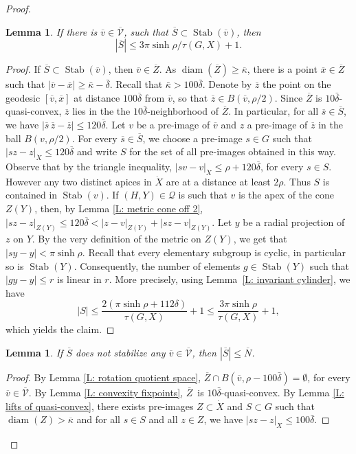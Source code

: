 \documentclass[11pt]{article}
\let\mathcal\mathscr
\theoremstyle{plain}
\newtheorem{lem}[thm]{Lemma}
\theoremstyle{definition}
\DeclareMathOperator{\diam}{diam}
\newcommand{\cX}{\dot{X}}
\newcommand{\q}[1]{\overline{#1}}
\newcommand{\stab}[1]{\operatorname{Stab}(#1)}
\begin{document}
\begin{proof}
\begin{lem}\label{L: acylindric quotient 2} If there is $\q v \in \q {\mathcal V}$, such that $\q S \subset \stab{\q v}$, then
\[
|\q S|\leqslant 3\pi \sinh\rho/\tau(G,X) +1.
\]
\end{lem}
\begin{proof} If $\q S \subset \stab{\q v}$, then $\q v\in \q Z$.
As $\diam (\q Z)\geqslant \q \kappa$, there is a point $\q x \in \q Z$ such that $|\q v - \q x| \geq \bar \kappa - \bar \delta$.
Recall that $\bar \kappa > 100 \bar \delta$.
Denote by $\q z$ the point on the geodesic $[\q v, \q x]$ at distance $100\q \delta$ from $\q v$, so that $\q z \in B(\q v, \rho/2)$.
Since $\q Z$ is $10\bar \delta$-quasi-convex, $\q z$ lies in the the $10\bar \delta$-neighborhood of $\q Z$.
In particular, for all $\q s \in \q S$, we have $|\q s \,\q z - \q z|\leqslant 120\q \delta$.
Let $v$ be a pre-image of $\q v$ and $z$ a pre-image of $\q z$ in the ball $B(v, \rho/2)$.
For every $\q s \in \q S$, we choose a pre-image $s \in G$ such that $|sz-z|_{\cX}\leqslant120 \q \delta$ and write $S$ for the set of all pre-images obtained in this way.
Observe that by the triangle inequality, $|sv - v|_{\cX} \leq \rho + 120\q\delta$, for every $s \in S$.
However any two distinct apices in $\cX$ are at a distance at least $2\rho$.
Thus $S$ is contained in $\stab v$.
If $(H,Y) \in \mathcal Q$ is such that $v$ is the apex of the cone $Z(Y)$, then, by Lemma \ref{L: metric cone off 2}, $|sz-z|_{Z(Y)}\leqslant 120\q \delta < |z - v|_{Z(Y)} + |sz - v|_{Z(Y)}$.
Let $y$ be a radial projection of $z$ on $Y$.
By the very definition of the metric on $Z(Y)$, we get that $|sy-y|< \pi \sinh\rho$.
Recall that every elementary subgroup is cyclic, in particular so is $\stab Y$.
Consequently, the number of elements $g \in \stab Y$ such that $|gy - y| \leq r$ is linear in $r$.
More precisely, using Lemma~\ref{L: invariant cylinder}, we have
\begin{equation*}
|S|\leqslant \frac{2(\pi \sinh\rho +112\delta)}{\tau(G,X)} + 1\leqslant \frac{3 \pi \sinh\rho}{\tau(G,X)}+1,
\end{equation*}
which yields the claim.
\end{proof}

\begin{lem}\label{L: acylindric quotient 4} If $\q S$ does not stabilize any $\q v \in \q{\mathcal V}$, then $|\q S|\leqslant \q N$.
\end{lem}

\begin{proof}
By Lemma \ref{L: rotation quotient space}, $\q Z \cap B(\q v, \rho- 100 \bar \delta)= \emptyset$, for every $\q v \in \q {\mathcal V}$.
By Lemma \ref{L: convexity fixpoints}, $\q Z$~is $10\bar \delta$-quasi-convex.
By Lemma \ref{L: lifts of quasi-convex}, there exists pre-images ${Z} \subset \cX$ and $S\subset G$ such that $\diam({Z})>\q \kappa$ and for all $s\in S$ and all $z\in Z$, we have $|sz-z|_{\cX}\leqslant 100 \bar \delta$.


\end{proof}
\end{proof}
\end{document}
